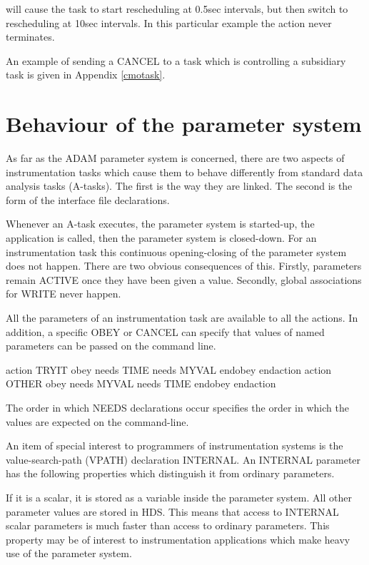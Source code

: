 \documentclass[twoside,11pt,nolof]{starlink}
\begin{document}
will cause the task to start rescheduling at 0.5sec intervals, but then
switch to rescheduling at 10sec intervals. In this particular example
the action never terminates.

An example of sending a CANCEL to a task which is controlling a
subsidiary task is given in Appendix \ref{cmotask}.

\section{Behaviour of the parameter system
}

As far as the ADAM parameter system is concerned, there are two aspects
of instrumentation tasks which cause them to behave differently from
standard data analysis tasks (A-tasks). The first is the way they are
linked. The second is the form of the interface file declarations.

Whenever an A-task executes, the parameter system is started-up, the
application is called, then the parameter system is closed-down. For an
instrumentation task this continuous opening-closing of the parameter
system does not happen. There are two obvious consequences of this.
Firstly, parameters remain ACTIVE once they have been given a value.
Secondly, global associations for WRITE never happen.

All the parameters of an instrumentation task are available to all the
actions. In addition, a specific OBEY or CANCEL can specify that values
of named parameters can be passed on the command line.

\begin{small}
\begin{terminalv}
   action TRYIT
      obey needs TIME
           needs MYVAL
      endobey
   endaction
   action OTHER
      obey needs MYVAL
           needs TIME
      endobey
   endaction
\end{terminalv}
\end{small}

The order in which NEEDS declarations occur specifies the order in
which the values are expected on the command-line.

An item of special interest to programmers of instrumentation systems is
the value-search-path (VPATH) declaration INTERNAL. An INTERNAL
parameter has the following properties which distinguish it from
ordinary parameters.

If it is a scalar, it is stored as a variable inside the parameter
system. All other parameter values are stored in HDS. This means that
access to INTERNAL scalar parameters is much faster than access to
ordinary parameters. This property may be of interest to instrumentation
applications which make heavy use of the parameter system.
\end{document}
